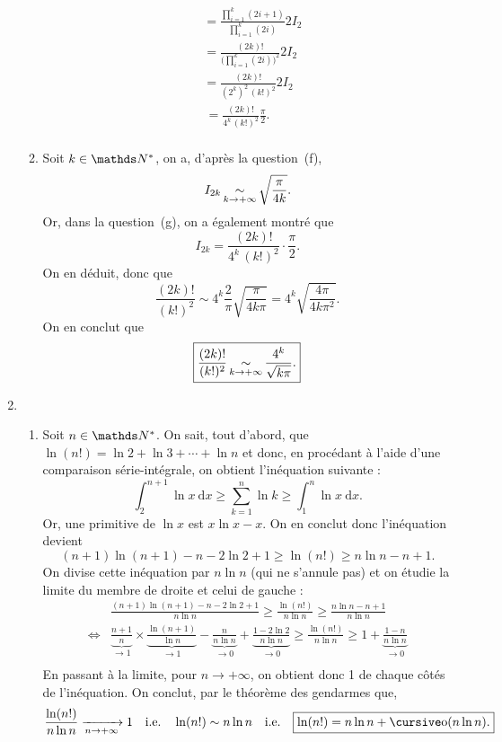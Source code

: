 \documentclass[a4paper]{article}
\begin{document}
\begin{enumerate}
\begin{enumerate}
\begin{align*}
						&= \frac{\prod_{i=1}^{k} (2i+1)}{\prod_{i=1}^k (2i)} 2I_2 \\
						&= \frac{(2k)!}{\Big(\prod_{i=1}^k (2i)\Big)^{\!\!2}} 2I_2 \\
						&= \frac{(2k)!}{(2^k)^2\,(k!)^2} 2I_2\\
						&\!\!\,\boxed{= \frac{(2k)!}{4^k\,(k!)^2} \frac{\pi}{2}.} \\
					\end{align*}
				\item Soit $k \in \N^*$, on a, d'après la question~(f),  \[
						I_{2k} \operatorname*{\sim}_{k\to +\infty} \sqrt{\frac{\pi}{4k}}
				.\] Or, dans la question~(g), on a également montré que \[
					I_{2k} = \frac{(2k)!}{4^k\,(k!)^2} \cdot \frac{\pi}{2}
				.\] On en déduit, donc que
				\[
					\frac{(2k)!}{(k!)^2} \sim 4^k \frac{2}{\pi} \sqrt{\frac{\pi}{4k\pi}} = 4^k \sqrt{\frac{4\pi}{4k\pi^2}}
				.\] On en conclut que \[
					\boxed{ \frac{(2k)!}{(k!)^2} \operatorname*{\sim}_{k\to +\infty} \frac{4^k}{\sqrt{k\pi}}.}
				\]
			\end{enumerate}
		\item
			\begin{enumerate}
				\item Soit $n \in \N^*$. On sait, tout d'abord, que $\ln(n!) = \ln 2 + \ln 3 + \cdots + \ln n$\/ et donc, en procédant à l'aide d'une comparaison série-intégrale, on obtient l'inéquation suivante : \[
					\int_{2}^{n+1} \ln x~\mathrm{d}x \ge \sum_{k=1}^n \ln k \ge \int_{1}^{n} \ln x~\mathrm{d}x
				.\] Or, une primitive de $\ln x$\/ est $x \ln x - x$. On en conclut donc l'inéquation devient \[
					(n+1) \ln(n+1) - n - 2 \ln 2 + 1 \ge \ln(n!) \ge n \ln n - n+ 1
				.\] On divise cette inéquation par $n \ln n$\/ (qui ne s'annule pas) et on étudie la limite du membre de droite et celui de gauche :
					\begin{align*}
						&\frac{(n+1) \ln (n+1) - n - 2 \ln 2 + 1}{n \ln n} \ge \frac{\ln(n!)}{n \ln n} \ge  \frac{n \ln n - n + 1}{n \ln n}\\
						\iff& \underbrace{\frac{n+1}{n}}_{\to 1} \times \underbrace{\frac{\ln(n+1)}{\ln n}}_{\to 1} - \underbrace{\frac{n}{n \ln n}}_{\to 0} + \underbrace{\frac{1 - 2\ln 2}{n \ln n}}_{\to 0} \ge \frac{\ln(n!)}{n \ln n} \ge 1 + \underbrace{\frac{1 - n}{n \ln n}}_{\to 0}\\
					\end{align*}
					En passant à la limite, pour $n \to +\infty$, on obtient donc 1 de chaque côtés de l'inéquation. On conclut, par le théorème des gendarmes que, \[
						\frac{\ln(n!)}{n \ln n} \tendsto{n\to +\infty} 1\quad\text{i.e.}\quad\ln(n!) \sim n \ln n\quad\text{i.e.}\quad\boxed{\ln(n!) = n \ln n + \po(n \ln n).}
\]
\end{enumerate}
\end{enumerate}
\end{document}
